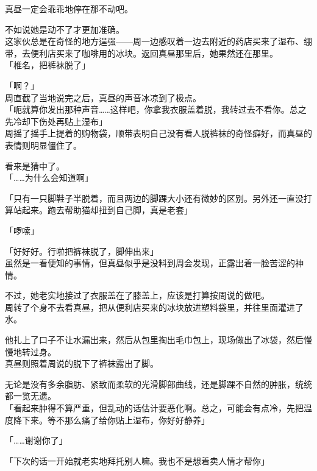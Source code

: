 真昼一定会乖乖地停在那不动吧。

不如说她是动不了才更加准确。\\

这家伙总是在奇怪的地方逞强——周一边感叹着一边去附近的药店买来了湿布、绷带，去便利店买来了咖啡用的冰块。返回真昼那里后，她果然还在那里。\\

「椎名，把裤袜脱了」

「啊？」\\

周直截了当地说完之后，真昼的声音冰凉到了极点。\\

「呃就算你发出那种声音……这样吧，你拿我衣服盖着脱，我转过去不看你。总之先冷却下伤处再贴上湿布」\\

周摇了摇手上提着的购物袋，顺带表明自己没有看人脱裤袜的奇怪癖好，而真昼的表情则明显僵住了。

看来是猜中了。\\

「……为什么会知道啊」

「只有一只脚鞋子半脱着，而且两边的脚踝大小还有微妙的区别。另外还一直没打算站起来。跑去帮助猫却扭到自己脚，真是老套」

「啰嗦」

「好好好。行啦把裤袜脱了，脚伸出来」\\

虽然是一看便知的事情，但真昼似乎是没料到周会发现，正露出着一脸苦涩的神情。

不过，她老实地接过了衣服盖在了膝盖上，应该是打算按周说的做吧。\\

周转了个身不去看真昼，把从便利店买来的冰块放进塑料袋里，并往里面灌进了水。

他扎上了口子不让水漏出来，然后从包里掏出毛巾包上，现场做出了冰袋，然后慢慢地转过身。\\

真昼则照着周说的脱下了裤袜露出了脚。

无论是没有多余脂肪、紧致而柔软的光滑脚部曲线，还是脚踝不自然的肿胀，统统都一览无遗。\\

「看起来肿得不算严重，但乱动的话估计要恶化啊。总之，可能会有点冷，先把温度降下来。等不那么痛了给你贴上湿布，你好好静养」

「……谢谢你了」

「下次的话一开始就老实地拜托别人嘛。我也不是想着卖人情才帮你」\\

